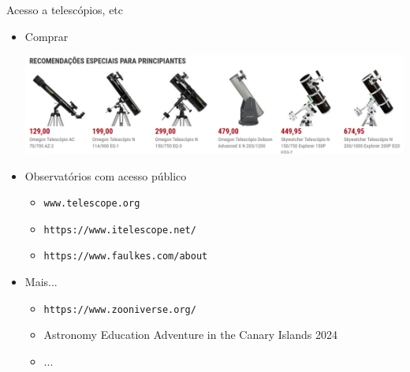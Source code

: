 \documentclass[beamer,9pt,aspectratio=169]{beamer}
\begin{document}
\begin{frame}{Acesso a telescópios, etc}
  \begin{itemize}
    \setlength{\itemsep}{2em}
    \item Comprar
    \begin{center}
      \includegraphics[width=0.8\linewidth]{figs/astroshop.png}
    \end{center}
  \item Observatórios com acesso público
    \begin{itemize}
      \item \texttt{www.telescope.org}
      \item \texttt{https://www.itelescope.net/}
      \item \texttt{https://www.faulkes.com/about}
    \end{itemize}
  \item Mais...
    \begin{itemize}
      \item \texttt{https://www.zooniverse.org/}
      \item
        Astronomy Education Adventure in the Canary Islands 2024
      \item ...
    \end{itemize}
  \end{itemize}
\end{frame}
\end{document}
